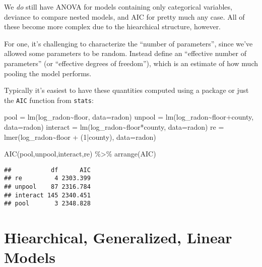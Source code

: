 \documentclass[
]{article}
\newenvironment{Shaded}{\begin{snugshade}}{\end{snugshade}}
\newcommand{\AttributeTok}[1]{\textcolor[rgb]{0.77,0.63,0.00}{#1}}
\newcommand{\DecValTok}[1]{\textcolor[rgb]{0.00,0.00,0.81}{#1}}
\newcommand{\FunctionTok}[1]{\textcolor[rgb]{0.00,0.00,0.00}{#1}}
\newcommand{\NormalTok}[1]{#1}
\newcommand{\OtherTok}[1]{\textcolor[rgb]{0.56,0.35,0.01}{#1}}
\newcommand{\SpecialCharTok}[1]{\textcolor[rgb]{0.00,0.00,0.00}{#1}}
\begin{document}
We \emph{do} still have ANOVA for models containing only categorical
variables, deviance to compare nested models, and AIC for pretty much
any case. All of these become more complex due to the hiearchical
structure, however.

For one, it's challenging to characterize the ``number of parameters'',
since we've allowed some parameters to be random. Instead define an
``effective number of parameters'' (or ``effective degrees of
freedom''), which is an estimate of how much pooling the model performs.

Typically it's easiest to have these quantities computed using a package
or just the \texttt{AIC} function from \texttt{stats}:

\begin{Shaded}
\begin{Highlighting}[]
\NormalTok{pool }\OtherTok{=} \FunctionTok{lm}\NormalTok{(log\_radon}\SpecialCharTok{\textasciitilde{}}\NormalTok{floor, }\AttributeTok{data=}\NormalTok{radon)}
\NormalTok{unpool }\OtherTok{=} \FunctionTok{lm}\NormalTok{(log\_radon}\SpecialCharTok{\textasciitilde{}}\NormalTok{floor}\SpecialCharTok{+}\NormalTok{county, }\AttributeTok{data=}\NormalTok{radon)}
\NormalTok{interact }\OtherTok{=} \FunctionTok{lm}\NormalTok{(log\_radon}\SpecialCharTok{\textasciitilde{}}\NormalTok{floor}\SpecialCharTok{*}\NormalTok{county, }\AttributeTok{data=}\NormalTok{radon)}
\NormalTok{re }\OtherTok{=} \FunctionTok{lmer}\NormalTok{(log\_radon}\SpecialCharTok{\textasciitilde{}}\NormalTok{floor }\SpecialCharTok{+}\NormalTok{ (}\DecValTok{1}\SpecialCharTok{|}\NormalTok{county), }\AttributeTok{data=}\NormalTok{radon)}

\FunctionTok{AIC}\NormalTok{(pool,unpool,interact,re) }\SpecialCharTok{\%\textgreater{}\%} \FunctionTok{arrange}\NormalTok{(AIC)}
\end{Highlighting}
\end{Shaded}

\begin{verbatim}
##           df      AIC
## re         4 2303.399
## unpool    87 2316.784
## interact 145 2340.451
## pool       3 2348.828
\end{verbatim}

\hypertarget{hiearchical-generalized-linear-models}{%
\section{Hiearchical, Generalized, Linear
Models}\label{hiearchical-generalized-linear-models}}
\end{document}
